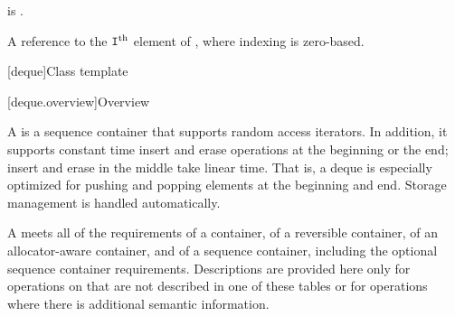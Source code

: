 \begin{itemdescr}
\pnum
\mandates
{} is .

\pnum
\returns
A reference to the $\tcode{I}^\text{th}$ element of ,
where indexing is zero-based.
\end{itemdescr}

[deque]{Class template }

[deque.overview]{Overview}

\pnum
A
%
is a sequence container that supports random access iterators.
In addition, it supports constant time insert and erase operations at the beginning or the end;
insert and erase in the middle take linear time.
That is, a deque is especially optimized for pushing and popping elements at the beginning and end.
Storage management is handled automatically.

\pnum
A  meets all of the requirements
of a container,
of a reversible container,
of an allocator-aware container, and
of a sequence container,
including the optional sequence container requirements.
Descriptions are provided here only for operations on
that are not described in one of these tables
or for operations where there is additional semantic information.


